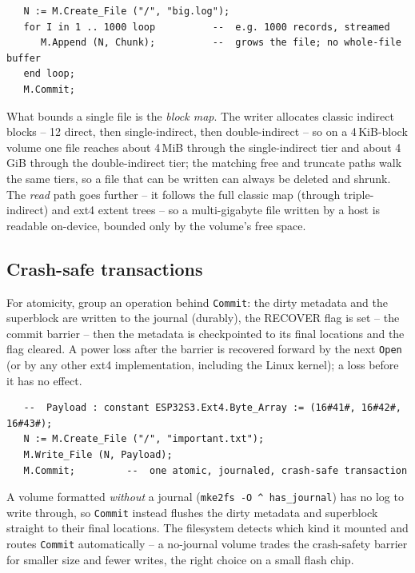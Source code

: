 \begin{lstlisting}
   N := M.Create_File ("/", "big.log");
   for I in 1 .. 1000 loop          --  e.g. 1000 records, streamed
      M.Append (N, Chunk);          --  grows the file; no whole-file buffer
   end loop;
   M.Commit;
\end{lstlisting}

What bounds a single file is the \emph{block map}. The writer allocates classic
indirect blocks -- 12 direct, then single-indirect, then double-indirect -- so
on a 4\,KiB-block volume one file reaches about 4\,MiB through the single-indirect
tier and about 4\,GiB through the double-indirect tier; the matching free and
truncate paths walk the same tiers, so a file that can be written can always be
deleted and shrunk. The \emph{read} path goes further -- it follows the full
classic map (through triple-indirect) and ext4 extent trees -- so a
multi-gigabyte file written by a host is readable on-device, bounded only by the
volume's free space.

\subsection{Crash-safe transactions}

For atomicity, group an operation behind \texttt{Commit}: the dirty metadata and
the superblock are written to the journal (durably), the RECOVER flag is set --
the commit barrier -- then the metadata is checkpointed to its final locations
and the flag cleared. A power loss after the barrier is recovered forward by the
next \texttt{Open} (or by any other ext4 implementation, including the Linux
kernel); a loss before it has no effect.

\begin{lstlisting}
   --  Payload : constant ESP32S3.Ext4.Byte_Array := (16#41#, 16#42#, 16#43#);
   N := M.Create_File ("/", "important.txt");
   M.Write_File (N, Payload);
   M.Commit;         --  one atomic, journaled, crash-safe transaction
\end{lstlisting}

A volume formatted \emph{without} a journal (\texttt{mke2fs -O \textasciicircum
has\_journal}) has no log to write through, so \texttt{Commit} instead flushes the
dirty metadata and superblock straight to their final locations. The filesystem
detects which kind it mounted and routes \texttt{Commit} automatically -- a
no-journal volume trades the crash-safety barrier for smaller size and fewer
writes, the right choice on a small flash chip.

